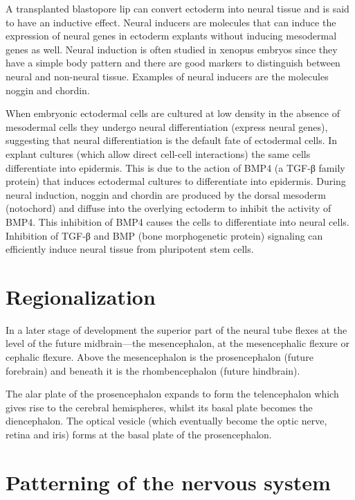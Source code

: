 A transplanted blastopore lip can convert ectoderm into neural tissue and is said to have an inductive effect. Neural inducers are molecules that can induce the expression of neural genes in ectoderm explants without inducing mesodermal genes as well. Neural induction is often studied in xenopus embryos since they have a simple body pattern and there are good markers to distinguish between neural and non-neural tissue. Examples of neural inducers are the molecules noggin and chordin.

When embryonic ectodermal cells are cultured at low density in the absence of mesodermal cells they undergo neural differentiation (express neural genes), suggesting that neural differentiation is the default fate of ectodermal cells. In explant cultures (which allow direct cell-cell interactions) the same cells differentiate into epidermis. This is due to the action of BMP4 (a TGF-β family protein) that induces ectodermal cultures to differentiate into epidermis. During neural induction, noggin and chordin are produced by the dorsal mesoderm (notochord) and diffuse into the overlying ectoderm to inhibit the activity of BMP4. This inhibition of BMP4 causes the cells to differentiate into neural cells. Inhibition of TGF-β and BMP (bone morphogenetic protein) signaling can efficiently induce neural tissue from pluripotent stem cells.

\hypertarget{regionalization}{%
\section{Regionalization}\label{regionalization}}

In a later stage of development the superior part of the neural tube flexes at the level of the future midbrain---the mesencephalon, at the mesencephalic flexure or cephalic flexure. Above the mesencephalon is the prosencephalon (future forebrain) and beneath it is the rhombencephalon (future hindbrain).

The alar plate of the prosencephalon expands to form the telencephalon which gives rise to the cerebral hemispheres, whilst its basal plate becomes the diencephalon. The optical vesicle (which eventually become the optic nerve, retina and iris) forms at the basal plate of the prosencephalon.

\hypertarget{patterning-of-the-nervous-system}{%
\section{Patterning of the nervous system}\label{patterning-of-the-nervous-system}}

